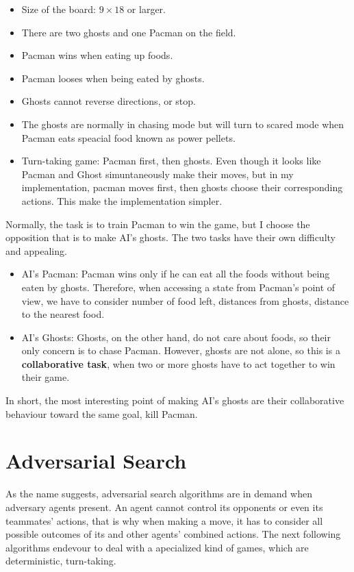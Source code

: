 \documentclass[a4paper, 11pt]{article}
\begin{document}
\begin{itemize}
\item Size of the board: $9\times 18$ or larger.
\item There are two ghosts and one Pacman on the field.
\item Pacman wins when eating up foods.
\item Pacman looses when being eated by ghosts.
\item Ghosts cannot reverse directions, or stop.
\item The ghosts are normally in chasing mode but will turn to scared mode when Pacman eats speacial food known as power pellets.
\item Turn-taking game: Pacman first, then ghosts. Even though it looks like Pacman and Ghost simuntaneously make their moves, but in my implementation, pacman moves first, then ghosts choose their corresponding actions. This make the implementation simpler.
\end{itemize}
Normally, the task is to train Pacman to win the game, but I choose the opposition that is to make AI's ghosts. The two tasks have their own difficulty and appealing. 
\begin{itemize} 
\item AI's Pacman: Pacman wins only if he can eat all the foods without being eaten by ghosts. Therefore, when accessing a state from Pacman's point of view, we have to consider number of food left, distances from ghosts, distance to the nearest food.
\item AI's Ghosts: Ghosts, on the other hand, do not care about foods, so their only concern is to chase Pacman. However, ghosts are not alone, so this is a \textbf{collaborative task}, when two or more ghosts have to act together to win their game.
\end{itemize}
In short, the most interesting point of making AI's ghosts are their collaborative behaviour toward the same goal, kill Pacman.
\newpage
\section{Adversarial Search}
As the name suggests, adversarial search algorithms are in demand when adversary agents present. An agent cannot control its opponents or even its teammates' actions, that is why when making a move, it has to consider all possible outcomes of its and other agents' combined actions. The next following algorithms endevour to deal with a apecialized kind of games, which are deterministic, turn-taking.
\end{document}
